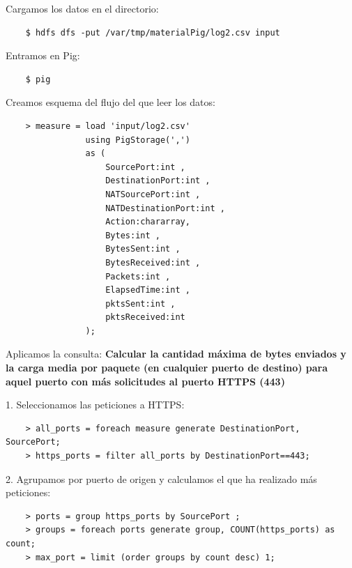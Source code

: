 \documentclass[13pt,a4paper]{article}
\begin{document}
Cargamos los datos en el directorio:
\begin{lstlisting}
    $ hdfs dfs -put /var/tmp/materialPig/log2.csv input
\end{lstlisting}

\vspace{\baselineskip}

Entramos en Pig:
\begin{lstlisting}
    $ pig
\end{lstlisting}

\newpage

Creamos esquema del flujo del que leer los datos:
\begin{lstlisting}
    > measure = load 'input/log2.csv' 
                using PigStorage(',') 
                as (
                    SourcePort:int ,
                    DestinationPort:int ,
                    NATSourcePort:int ,
                    NATDestinationPort:int ,
                    Action:chararray,
                    Bytes:int ,
                    BytesSent:int ,
                    BytesReceived:int ,
                    Packets:int ,
                    ElapsedTime:int ,
                    pktsSent:int ,
                    pktsReceived:int
                );
\end{lstlisting}

\vspace{\baselineskip}

Aplicamos la consulta: \textbf{Calcular la cantidad máxima de bytes enviados y la carga media por paquete 
(en cualquier puerto de destino) para aquel puerto con más solicitudes al 
puerto HTTPS (443)}

\vspace{\baselineskip}

1. Seleccionamos las peticiones a HTTPS:
\begin{lstlisting}
    > all_ports = foreach measure generate DestinationPort, SourcePort;
    > https_ports = filter all_ports by DestinationPort==443;
\end{lstlisting}

\vspace{\baselineskip}

2. Agrupamos por puerto de origen y calculamos el que ha realizado más peticiones:
\begin{lstlisting}
    > ports = group https_ports by SourcePort ;
    > groups = foreach ports generate group, COUNT(https_ports) as count;
    > max_port = limit (order groups by count desc) 1;
\end{lstlisting}
\end{document}

